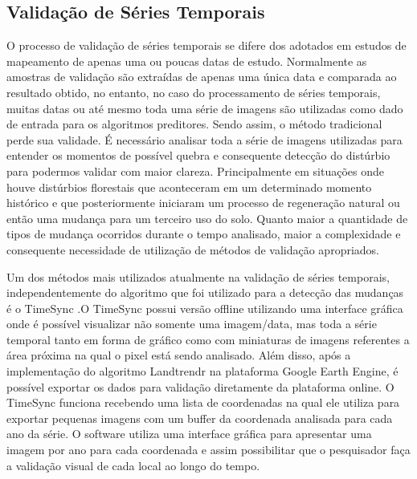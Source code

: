 \documentclass[12pt,a4paper]{article}
\begin{document}
\subsection{Validação de Séries Temporais}
O processo de validação de séries temporais se difere dos adotados em estudos de mapeamento de apenas uma ou poucas datas de estudo. Normalmente as amostras de validação são extraídas de apenas uma única data e comparada ao resultado obtido, no entanto, no caso do processamento de séries temporais, muitas datas ou até mesmo toda uma série de imagens são utilizadas como dado de entrada para os algoritmos preditores. Sendo assim, o método tradicional perde sua validade. É necessário analisar toda a série de imagens utilizadas para entender os momentos de possível quebra e consequente detecção do distúrbio para podermos validar com maior clareza. Principalmente em situações onde houve distúrbios florestais que aconteceram em um determinado momento histórico e que posteriormente iniciaram um processo de regeneração natural ou então uma mudança para um terceiro uso do solo. Quanto maior a quantidade de tipos de mudança ocorridos durante o tempo analisado, maior a complexidade e consequente necessidade de utilização de métodos de validação apropriados.

Um dos métodos mais utilizados atualmente na validação de séries temporais, independentemente do algoritmo que foi utilizado para a detecção das mudanças é o TimeSync \citep{COHEN20102911}.O TimeSync possui versão offline utilizando uma interface gráfica onde é possível visualizar não somente uma imagem/data, mas toda a série temporal tanto em forma de gráfico como com miniaturas de imagens referentes a área próxima na qual o pixel está sendo analisado. Além disso, após a implementação do algoritmo Landtrendr na plataforma Google Earth Engine, é possível exportar os dados para validação diretamente da plataforma online.  O TimeSync funciona recebendo uma lista de coordenadas na qual ele utiliza para exportar pequenas imagens com um buffer da coordenada analisada para cada ano da série. O software utiliza uma interface gráfica para apresentar uma imagem por ano para cada coordenada e assim possibilitar que o pesquisador faça a validação visual de cada local ao longo do tempo. 
\end{document}
